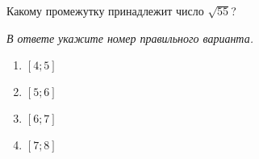 Какому промежутку принадлежит число $\sqrt{55}$?

\textit{В ответе укажите номер правильного варианта.}
\begin{multicols}{4}
	\begin{enumerate}[label=\arabic*)]
		\item $[4;5]$
		\item $[5;6]$
		\item $[6;7]$
		\item $[7;8]$
	\end{enumerate}
\end{multicols}